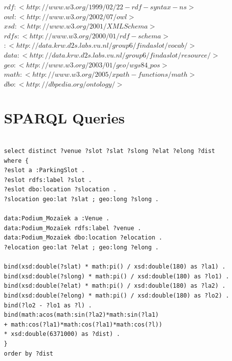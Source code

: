 \documentclass[runningheads,a4paper]{../../StyleFiles/llncs}
\begin{document}
$rdf: <http://www.w3.org/1999/02/22-rdf-syntax-ns>$ \\
$owl: <http://www.w3.org/2002/07/owl>$ \\
$xsd: <http://www.w3.org/2001/XMLSchema>$ \\
$rdfs: <http://www.w3.org/2000/01/rdf-schema>$ \\
$: <http://data.krw.d2s.labs.vu.nl/group6/findaslot/vocab/>$ \\
$data: <http://data.krw.d2s.labs.vu.nl/group6/findaslot/resource/>$ \\
$geo: <http://www.w3.org/2003/01/geo/wgs84\_pos>$ \\
$math: <http://www.w3.org/2005/xpath-functions/math>$ \\
$dbo: <http://dbpedia.org/ontology/>$

\section{SPARQL Queries}

\begin{lstlisting}[captionpos=b, caption=SPARQL query for getting parking spots close to Podium Mozaiek (sorted by distance), label=lst:sparql,
basicstyle=\ttfamily,frame=bt]

select distinct ?venue ?slot ?slat ?slong ?elat ?elong ?dist
where {
?eslot a :ParkingSlot .
?eslot rdfs:label ?slot .
?eslot dbo:location ?slocation .
?slocation geo:lat ?slat ; geo:long ?slong .

data:Podium_Mozaïek a :Venue .
data:Podium_Mozaïek rdfs:label ?venue .
data:Podium_Mozaïek dbo:location ?elocation .
?elocation geo:lat ?elat ; geo:long ?elong .

bind(xsd:double(?slat) * math:pi() / xsd:double(180) as ?la1) .
bind(xsd:double(?slong) * math:pi() / xsd:double(180) as ?lo1) .
bind(xsd:double(?elat) * math:pi() / xsd:double(180) as ?la2) .
bind(xsd:double(?elong) * math:pi() / xsd:double(180) as ?lo2) .
bind(?lo2 - ?lo1 as ?l) .
bind(math:acos(math:sin(?la2)*math:sin(?la1) 
+ math:cos(?la1)*math:cos(?la1)*math:cos(?l)) 
* xsd:double(6371000) as ?dist) .
}
order by ?dist

\end{lstlisting}
\end{document}
